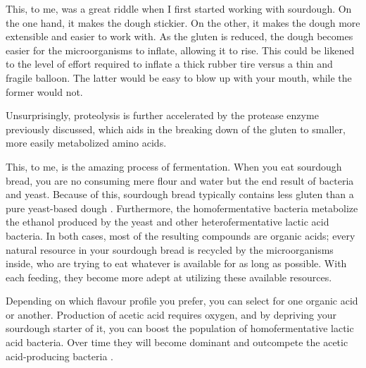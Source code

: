 This, to me, was a great riddle when I first started working with sourdough.
On the one hand, it makes the dough stickier. On the other, it makes the dough
more extensible and easier to work with. As the gluten is reduced, the dough
becomes easier for the microorganisms to inflate, allowing it to rise. This
could be likened to the level of effort required to inflate a thick rubber tire
versus a thin and fragile balloon. The latter would be easy to blow up with
your mouth, while the former would not.

Unsurprisingly, proteolysis is further accelerated by the protease enzyme
previously discussed, which aids in the breaking down of the gluten to smaller,
more easily metabolized amino acids.

This, to me, is the amazing process of fermentation. When you eat sourdough
bread, you are no consuming mere flour and water but the end result of bacteria
and yeast. Because of this, sourdough bread typically contains less gluten than
a pure yeast-based dough \cite{proteolysis+sourdough+bacteria}. Furthermore,
the homofermentative bacteria metabolize the ethanol produced by the yeast and
other heterofermentative lactic acid bacteria. In both cases, most of the
resulting compounds are organic acids; every natural resource in your sourdough
bread is recycled by the microorganisms inside, who are trying to eat whatever
is available for as long as possible. With each feeding, they become more adept
at utilizing these available resources.

Depending on which flavour profile you prefer, you can select for one organic
acid or another. Production of acetic acid requires oxygen, and by depriving
your sourdough starter of it, you can boost the population of homofermentative
lactic acid bacteria. Over time they will become dominant and outcompete the
acetic acid-producing bacteria \cite{acetic+acid+oxygen}.

